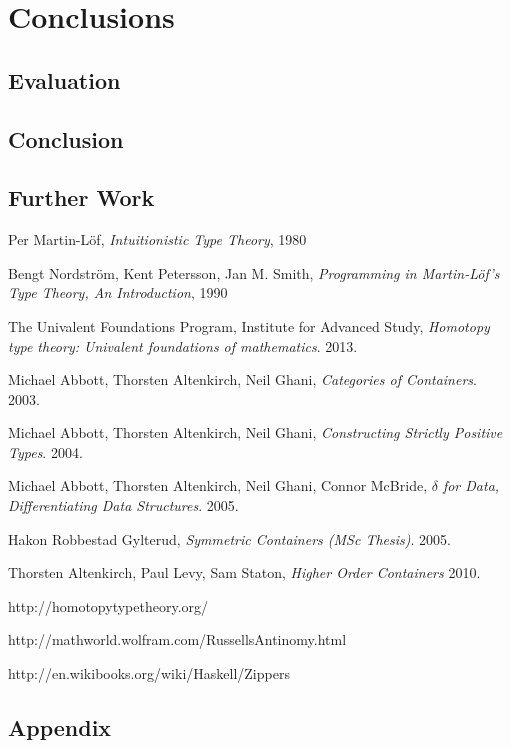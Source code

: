 \documentclass[12pt]{report}
\begin{document}
\part{Conclusions}

\chapter{Evaluation}

\chapter{Conclusion}

\chapter{Further Work}

\cleardoublepage
{}
{}

\begin{thebibliography}{10}

  Per Martin-L\"of,
  \emph{Intuitionistic Type Theory},
  1980

  Bengt Nordstr\"om, Kent Petersson, Jan M. Smith,
  \emph{Programming in Martin-L\"of's Type Theory, An Introduction},
  1990

  The Univalent Foundations Program, Institute for Advanced Study,
  \emph{Homotopy type theory: Univalent foundations of mathematics}.
  2013.

  Michael Abbott, Thorsten Altenkirch, Neil Ghani,
  \emph{Categories of Containers}.
  2003.

  Michael Abbott, Thorsten Altenkirch, Neil Ghani,
  \emph{Constructing Strictly Positive Types}.
  2004.
  
  Michael Abbott, Thorsten Altenkirch, Neil Ghani, Connor McBride,
  \emph{$\delta$ for Data, Differentiating Data Structures}.
  2005.

  Hakon Robbestad Gylterud,
  \emph{Symmetric Containers (MSc Thesis)}.
  2005.
  
  Thorsten Altenkirch, Paul Levy, Sam Staton,
  \emph{Higher Order Containers}
  2010.
  
  http://homotopytypetheory.org/
  
  http://mathworld.wolfram.com/RussellsAntinomy.html
  
  http://en.wikibooks.org/wiki/Haskell/Zippers

\end{thebibliography}
\cleardoublepage
{}
{}

\chapter{Appendix}
\end{document}
